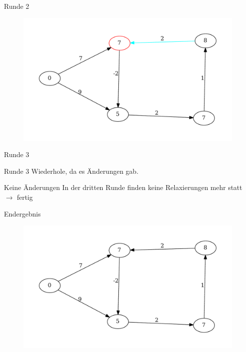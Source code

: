 \begin{frame}{Runde 2}
\begin{figure}[htbp]
\centering
\includegraphics[width=\linewidth]{bellman_ford_graphs/graph_13.pdf}
\end{figure}
\end{frame}

\begin{frame}{Runde 3}
	\begin{block}{Runde 3}
	Wiederhole, da es Änderungen gab.
	\end{block}
	\begin{block}{Keine Änderungen}
	In der dritten Runde finden keine Relaxierungen mehr statt $\rightarrow$ fertig
	\end{block}
\end{frame}

\begin{frame}{Endergebnis}

\begin{figure}[htbp]
\centering
\includegraphics[width=\linewidth]{bellman_ford_graphs/graph_14.pdf}
\end{figure}

\end{frame}

